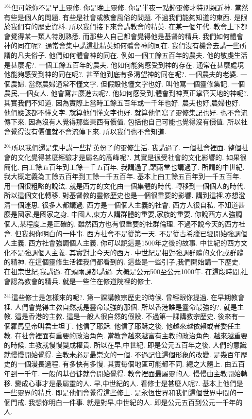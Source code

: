 \documentclass{book}
\begin{document}
$^{161}$但可能你不是早上靈修.
你是晚上靈修.
你是半夜一點鐘靈修才特別親近神.
當然有些是個人的問題.
有些是社會或教會風俗的問題.
不過我們能夠知道的東西.
是限於我們有的歷史資料.
所以我們接下來會講教會的精英.
在某一個年代.
教會上下都會覺得某一類人特別熟悉.
而那些人自己都會覺得他是基督的精兵.
我們如何體會神的同在呢?.
通常會集中講這批精英如何體會神的同在.
我們沒有機會去講一些所謂的凡夫俗子.
他們如何體會神的同在.
例如一個工餘五百年的農夫.
他的敬虔生活是甚麼呢?.
一個工餘五百年的農夫.
他如何能夠感受到神的存在.
通常在甚麼處境他能夠感受到神的同在呢?.
甚至他到底有多渴望神的同在呢?.
一個農夫的老婆.
一個農婦.
當然農婦通常不懂文字.
但假設他懂文字也好.
叫他寫一個靈修集記.
一個農民,一個女人.
他會寫甚麼進去呢?.
他如何感受到,體會到神真正掌管天地的神呢?.
其實我們不知道.
因為實際上當時工餘五百年或一千年也好.
農夫也好,農婦也好.
他們應該都不懂文字.
就算他們懂文字也好.
就算他們寫了靈修集記也好.
也不會流傳下來.
因為沒有人覺得那些東西有價值.
包括他自己可能也覺得沒有價值.
所以社會覺得沒有價值就不會流傳下來.
所以我們也不會知道.

$^{201}$所以我們還是集中講一些精英份子的靈修生活.
我講過了.
一個社會裡面.
整個社會的文化覺得甚麼經驗才是屬名的高峰呢?.
其實是很受社會的文化影響的.
如果很簡化.
由工餘五百年到工餘一千五百年.
我講過了,頭兩堂也講過了.
所謂的中世紀.
我大概定義為工餘五百年到工餘一千五百年.
基本上由工餘五百年到一千五百年.
用一個很粗略的說法.
就是西方的文化由一個集體的時代.
轉移到一個個人的時代.
所以這個文化轉移.
對基督教的靈修歷史也是一個很重要的影響.
講到這裡,亦想澄清一個迷思.
很多人都講過.
西方是一個個人主義的社會.
西方人很自私.
不知道甚麼是國家,是國家之身.
中國人,東方人講群體的重要,家族的重要.
你說西方人強調個人,某程度上是正確的.
雖然西方也有很重要的社群倫理.
不過不說今天的西方社會.
但我想你明白的一件事.
西方社會不是從第一天.
不是從古希臘已經開始強調個人主義.
西方社會強調個人主義.
你可以說這是1500年之後的故事.
中世紀的西方文化不是強調個人主義.
其實對比今天的西方.
中世紀是相對強調群體的文化或群體的精神.
在這個靈修生活裡我們都看到的.
這些是一些引子,我們開始講一下歷史.
在祖宗世紀,我講過.
在頭兩課都講過.
大概是公元500至公元1000年.
在這段時間,社會認為教會的精兵.
就是一些住在修道院裡的修士.

$^{241}$這些修士是怎樣來的呢?.
第一課講教宗歷史的時候.
曾經跟你提過.
在早期教會裡.
人們會覺得主教自然就是靈命最強的那個.
所以香港誰是靈命最強的?.
就是主教.
這是香港的主教.
這是一般人很自然的假設.
不過第一課講教宗歷史.
後來有一個羅馬皇帝叫君士坦丁.
他信了耶穌.
他信了耶穌之後.
他越來越依賴或者委任主教.
在社會裡面有重要的政治角色.
當教會越來越富有主教的政治角色.
越來越重要的時候.
主教就慢慢變成權貴.
所以在早,中世紀.
即是公元五百年之後.
人們的意識就慢慢開始覺得.
主教未必是最崇文的一個.
不過記住這個形象的改變.
是幾百年歷史的一個漫長過程.
有多快有多慢.
其實每個地區可能都不同.
總之大體上.
由五百年到一千年.
一般的基督徒就會開始覺得.
教會裡面最屬靈的人.
慢慢由主教開始轉移.
變成心事才是最屬靈的人.
早,中世紀的人.
看修士是甚麼人呢?.
基本上他們是一些靈界的精兵.
即是他們會覺得這些修士.
是永恆世界和我們這個世界中間的一個門戒.
我想你明白一件事.
就是對早,中世紀的人.
即是公元五百到公元一千年的人.
\end{document}
